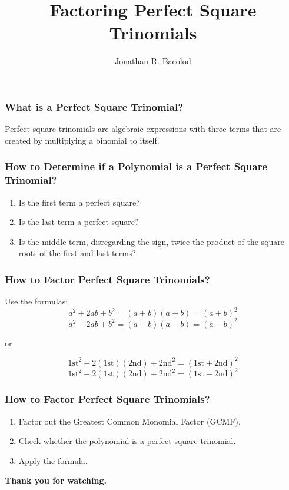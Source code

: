 \documentclass[14pt]{beamer}
\title[] {Factoring Perfect Square Trinomials}
\author{Jonathan R. Bacolod}
\institute[SHS]{Sauyo High School}
\date{}
\begin{document}
	\frame{\titlepage}
	
	\begin{frame}
		\frametitle{What is a Perfect Square Trinomial?}
		Perfect square trinomials are algebraic expressions with three terms that are created by multiplying a binomial to itself. 
	\end{frame}

    \begin{frame}
    	\frametitle{How to Determine if a Polynomial is a Perfect Square Trinomial?}
    	\begin{enumerate}
    		\item<1-> Is the first term a perfect square?
    		\item<2-> Is the last term a perfect square?
    		\item<3-> Is the middle term, disregarding the sign, twice the product of the square roots of the first and last terms?
    	\end{enumerate} 
    \end{frame}

    \begin{frame}
    	\frametitle{How to Factor Perfect Square Trinomials?}
    	Use the formulas:
    	\[ a^2 + 2ab + b^2 = (a+b)(a+b) = (a+b)^2 \]
    	\[ a^2 - 2ab + b^2 = (a-b)(a-b) = (a-b)^2 \]

    	\begin{center}
    		or 
    	\end{center}
        \[ \text{1st}^2 + 2(\text{1st})(\text{2nd})  + \text{2nd}^2 = (\text{1st} + \text{2nd})^2\]
        \[ \text{1st}^2 - 2(\text{1st})(\text{2nd}) + \text{2nd}^2 = (\text{1st} - \text{2nd})^2\]
    
    \end{frame}

    \begin{frame}
    	\frametitle{How to Factor Perfect Square Trinomials?}
    	\begin{enumerate}
    		\item<1-> Factor out the Greatest Common Monomial Factor (GCMF).
    		\item<2-> Check whether the polynomial is a perfect square trinomial.
    		\item<3-> Apply the formula.
    	\end{enumerate} 
    \end{frame}

    \begin{frame}
    	\begin{center}
    		\textbf{\LARGE Thank you for watching.}
    	\end{center}
    \end{frame}
	
\end{document}
